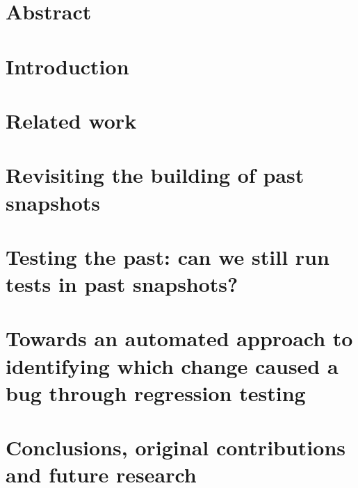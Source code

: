 \documentclass[11pt,a4paper,twoside]{book}
\begin{document}
\frontmatter





\chapter{Abstract}




\mainmatter
\restoreHeader

\chapter{Introduction}
\label{chapter:intro} 
 

\chapter{Related work}
\label{chapter:related-work}


\chapter{Revisiting the building of past snapshots}
\label{chapter:buildability}


\chapter{Testing the past: can we still run tests in past snapshots?}
\label{chapter:testability}


\chapter{Towards an automated approach to identifying which change caused a bug through regression testing}
\label{chapter:bug-hunter}


\chapter{Conclusions, original contributions and future research}
\label{chapter:conclusions}


\backmatter

%
%



\end{document}
